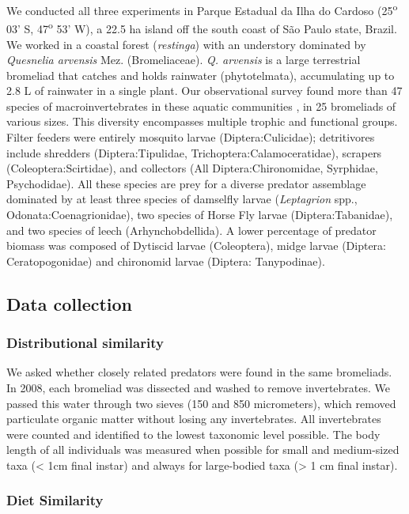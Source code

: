 \documentclass[11pt]{article}
\begin{document}
We conducted all three experiments in Parque Estadual da Ilha do Cardoso
(25\textsuperscript{o} 03' S, 47\textsuperscript{o} 53' W), a 22.5 ha
island off the south coast of S\~ao Paulo state, Brazil. We worked in a
coastal forest (\emph{restinga}) with an understory dominated by
\emph{Quesnelia arvensis} Mez. (Bromeliaceae). \emph{Q. arvensis} is a
large terrestrial bromeliad that catches and holds rainwater
(phytotelmata), accumulating up to 2.8 L of rainwater in a single plant.
Our observational survey found more than 47 species of
macroinvertebrates in these aquatic communities \citealt{Romero2010}, in
25 bromeliads of various sizes. This diversity encompasses multiple
trophic and functional groups. Filter feeders were entirely mosquito
larvae (Diptera:Culicidae); detritivores include shredders
(Diptera:Tipulidae, Trichoptera:Calamoceratidae), scrapers
(Coleoptera:Scirtidae), and collectors (All Diptera:Chironomidae,
Syrphidae, Psychodidae). All these species are prey for a diverse
predator assemblage dominated by at least three species of damselfly
larvae (\emph{Leptagrion} spp., Odonata:Coenagrionidae), two species of
Horse Fly larvae (Diptera:Tabanidae), and two species of leech
(Arhynchobdellida). A lower percentage of predator biomass was composed
of Dytiscid larvae (Coleoptera), midge larvae (Diptera: Ceratopogonidae)
and chironomid larvae (Diptera: Tanypodinae).

\subsection*{Data collection}\label{data-collection}

\subsubsection*{Distributional similarity}

We asked whether closely related predators were found in the same
bromeliads. In 2008, each bromeliad was dissected and washed to remove
invertebrates. We passed this water through two sieves (150 and 850 micrometers),
which removed particulate organic matter without losing any
invertebrates. All invertebrates were counted and identified to the
lowest taxonomic level possible. The body length of all individuals was
measured when possible for small and medium-sized taxa (\textless{} 1cm
final instar) and always for large-bodied taxa (\textgreater{} 1 cm
final instar).

\subsubsection*{Diet Similarity}
\end{document}
